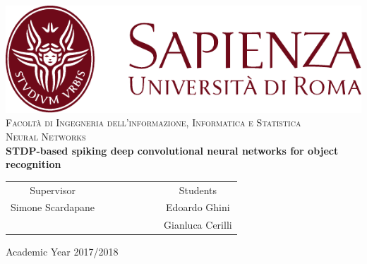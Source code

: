 \begin{titlepage}
\begin{center}
	\includegraphics[scale=0.8]{images/SapienzaLogo} \\
	\vspace{3em}
	{\large \textsc{Facoltà di  Ingegneria dell'informazione, Informatica e Statistica}} \\
	\vspace{2em}
	{\large \textsc{Neural Networks}} \\
	\doublespacing
	\vspace{5em}
	{\Large \textbf{STDP-based spiking deep convolutional neural networks for object recognition}}
\end{center}

\vskip 2cm
\begin{center}
\begin{tabular}{c c c c c c c c}
	Supervisor & & & & & & & Students \\[0.2cm]
	\large{Simone Scardapane} & & & & & & & \large{Edoardo Ghini}\\[0.2cm]
	\large{} & & & & & & & \large{Gianluca Cerilli}\\
	\end{tabular}
\end{center}

\vskip 1.5cm
\begin{center}
	{\normalsize Academic Year 2017/2018}
\end{center}
\end{titlepage}

\clearpage{\pagestyle{empty}\cleardoublepage}

\vspace{5em}

\onehalfspacing

\clearpage{\pagestyle{empty}\cleardoublepage}
